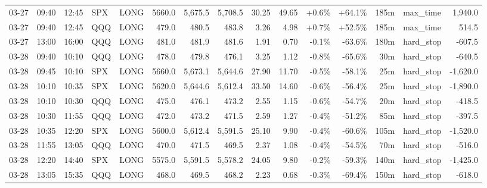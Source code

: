 \documentclass[11pt,a4paper,twoside]{article}
\begin{document}
\begin{landscape}
\begin{center}
\begin{longtable}{>{\color{txtmain}}l l l l l r r r r r r r r >{\color{txtmain}}l r}
03-27 & 09:40 & 12:45 & SPX & LONG & 5660.0 & 5,675.5 & 5,708.5 & 30.25 & 49.65 & \textcolor{wingreen}{+0.6\%} & \textcolor{wingreen}{+64.1\%} & 185m & max\_time & \textcolor{wingreen}{1,940.0} \\
03-27 & 09:40 & 12:45 & QQQ & LONG & 479.0 & 480.5 & 483.8 & 3.26 & 4.98 & \textcolor{wingreen}{+0.7\%} & \textcolor{wingreen}{+52.5\%} & 185m & max\_time & \textcolor{wingreen}{514.5} \\
03-27 & 13:00 & 16:00 & QQQ & LONG & 481.0 & 481.9 & 481.6 & 1.91 & 0.70 & \textcolor{lossred}{-0.1\%} & \textcolor{lossred}{-63.6\%} & 180m & hard\_stop & \textcolor{lossred}{-607.5} \\
03-28 & 09:40 & 10:10 & QQQ & LONG & 478.0 & 479.8 & 476.1 & 3.25 & 1.12 & \textcolor{lossred}{-0.8\%} & \textcolor{lossred}{-65.6\%} & 30m & hard\_stop & \textcolor{lossred}{-640.5} \\
03-28 & 09:45 & 10:10 & SPX & LONG & 5660.0 & 5,673.1 & 5,644.6 & 27.90 & 11.70 & \textcolor{lossred}{-0.5\%} & \textcolor{lossred}{-58.1\%} & 25m & hard\_stop & \textcolor{lossred}{-1,620.0} \\
03-28 & 10:10 & 10:35 & SPX & LONG & 5620.0 & 5,644.6 & 5,612.4 & 33.50 & 14.60 & \textcolor{lossred}{-0.6\%} & \textcolor{lossred}{-56.4\%} & 25m & hard\_stop & \textcolor{lossred}{-1,890.0} \\
03-28 & 10:10 & 10:30 & QQQ & LONG & 475.0 & 476.1 & 473.2 & 2.55 & 1.15 & \textcolor{lossred}{-0.6\%} & \textcolor{lossred}{-54.7\%} & 20m & hard\_stop & \textcolor{lossred}{-418.5} \\
03-28 & 10:30 & 11:55 & QQQ & LONG & 472.0 & 473.2 & 471.5 & 2.59 & 1.27 & \textcolor{lossred}{-0.4\%} & \textcolor{lossred}{-51.2\%} & 85m & hard\_stop & \textcolor{lossred}{-397.5} \\
03-28 & 10:35 & 12:20 & SPX & LONG & 5600.0 & 5,612.4 & 5,591.5 & 25.10 & 9.90 & \textcolor{lossred}{-0.4\%} & \textcolor{lossred}{-60.6\%} & 105m & hard\_stop & \textcolor{lossred}{-1,520.0} \\
03-28 & 11:55 & 13:05 & QQQ & LONG & 470.0 & 471.5 & 469.5 & 2.37 & 1.08 & \textcolor{lossred}{-0.4\%} & \textcolor{lossred}{-54.5\%} & 70m & hard\_stop & \textcolor{lossred}{-516.0} \\
03-28 & 12:20 & 14:40 & SPX & LONG & 5575.0 & 5,591.5 & 5,578.2 & 24.05 & 9.80 & \textcolor{lossred}{-0.2\%} & \textcolor{lossred}{-59.3\%} & 140m & hard\_stop & \textcolor{lossred}{-1,425.0} \\
03-28 & 13:05 & 15:35 & QQQ & LONG & 468.0 & 469.5 & 468.2 & 2.23 & 0.68 & \textcolor{lossred}{-0.3\%} & \textcolor{lossred}{-69.4\%} & 150m & hard\_stop & \textcolor{lossred}{-618.0} \\

\end{longtable}
\end{center}
\end{landscape}
\end{document}
